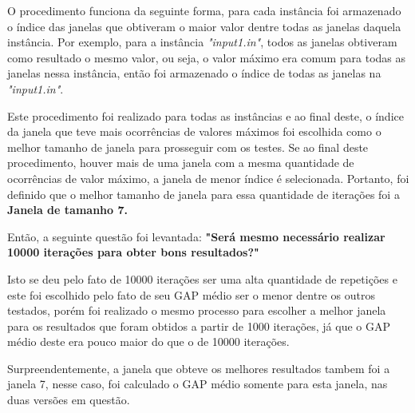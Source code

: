\documentclass[a4paper, 12pt]{article}
\begin{document}
O procedimento funciona da seguinte forma, para cada instância foi armazenado o índice das janelas que obtiveram
o maior valor dentre todas as janelas daquela instância. Por exemplo, para a instância \textit{"input1.in"},
todos as janelas obtiveram como resultado o mesmo valor, ou seja, o valor máximo era comum para todas as janelas
nessa instância, então foi armazenado o índice de todas as janelas na \textit{"input1.in"}.

Este procedimento foi realizado para todas as instâncias e ao final deste, o índice da janela que teve 
mais ocorrências de valores máximos foi escolhida como o melhor tamanho de janela para prosseguir com os testes. Se
ao final deste procedimento, houver mais de uma janela com a mesma quantidade de ocorrências de valor máximo,
a janela de menor índice é selecionada.
Portanto, foi definido que o melhor tamanho de janela para essa quantidade de iterações foi a \textbf{Janela de tamanho 7.}

Então, a seguinte questão foi levantada: \textbf{"Será mesmo necessário realizar 10000 iterações para obter bons resultados?"}

Isto se deu pelo fato de 10000 iterações ser uma alta quantidade de repetições e este foi escolhido
pelo fato de seu GAP médio ser o menor dentre os outros testados, porém foi realizado o 
mesmo processo para escolher a melhor janela para os resultados que foram obtidos a partir de 1000 iterações,
já que o GAP médio deste era pouco maior do que o de 10000 iterações.

Surpreendentemente, a janela que obteve os melhores resultados tambem foi a janela 7, nesse caso, foi calculado
o GAP médio somente para esta janela, nas duas versões em questão.

\begin{table}[htbp]
    \centering
\end{table}
\end{document}
